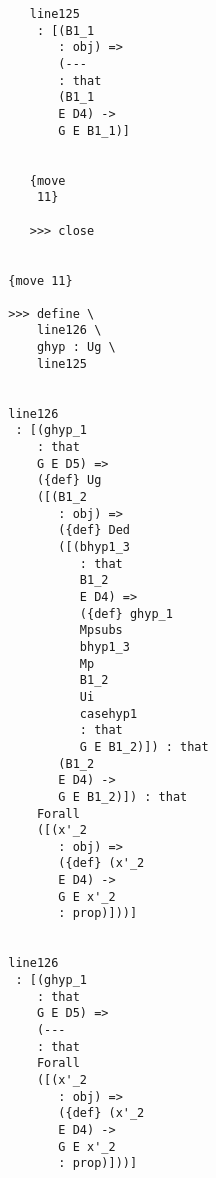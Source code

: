 \documentclass[12pt]{article}
\begin{document}
\begin{verbatim}
                                    line125 
                                     : [(B1_1 
                                        : obj) => 
                                        (--- 
                                        : that 
                                        (B1_1 
                                        E D4) -> 
                                        G E B1_1)]


                                    {move 
                                     11}

                                    >>> close


                                 {move 11}

                                 >>> define \
                                     line126 \
                                     ghyp : Ug \
                                     line125


                                 line126 
                                  : [(ghyp_1 
                                     : that 
                                     G E D5) => 
                                     ({def} Ug 
                                     ([(B1_2 
                                        : obj) => 
                                        ({def} Ded 
                                        ([(bhyp1_3 
                                           : that 
                                           B1_2 
                                           E D4) => 
                                           ({def} ghyp_1 
                                           Mpsubs 
                                           bhyp1_3 
                                           Mp 
                                           B1_2 
                                           Ui 
                                           casehyp1 
                                           : that 
                                           G E B1_2)]) : that 
                                        (B1_2 
                                        E D4) -> 
                                        G E B1_2)]) : that 
                                     Forall 
                                     ([(x'_2 
                                        : obj) => 
                                        ({def} (x'_2 
                                        E D4) -> 
                                        G E x'_2 
                                        : prop)]))]


                                 line126 
                                  : [(ghyp_1 
                                     : that 
                                     G E D5) => 
                                     (--- 
                                     : that 
                                     Forall 
                                     ([(x'_2 
                                        : obj) => 
                                        ({def} (x'_2 
                                        E D4) -> 
                                        G E x'_2 
                                        : prop)]))]



\end{verbatim}
\end{document}
